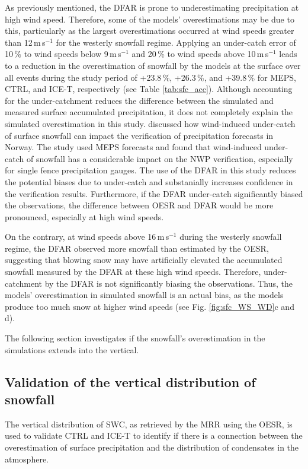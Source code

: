 \documentclass{ametsocV5}
\begin{document}
		As previously mentioned, the DFAR is prone to underestimating precipitation at high wind speed. Therefore, some of the models' overestimations may be due to this, particularly as the largest overestimations occurred at wind speeds greater than 12\,m\,s$^{-1}$ for the westerly snowfall regime. Applying an under-catch error of 10\,\% to wind speeds below 9\,m\,s$^{-1}$ and 20\,\% to wind speeds above 10\,m\,s$^{-1}$ leads to a reduction in the overestimation of snowfall by the models at the surface over all events during the study period of +23.8\,\%, +26.3\,\%, and +39.8\,\% for MEPS, CTRL, and ICE-T, respectively (see Table \ref{tab:sfc_acc}). Although accounting for the under-catchment reduces the difference between the simulated and measured surface accumulated precipitation, it does not completely explain the simulated overestimation in this study. \citet{koltzow_verification_2020} discussed how wind-induced under-catch of surface snowfall can impact the verification of precipitation forecasts in Norway. The study used MEPS forecasts and found that wind-induced under-catch of snowfall has a considerable impact on the NWP verification, especially for single fence precipitation gauges. The use of the DFAR in this study reduces the potential biases due to under-catch and substanially increases confidence in the verification results. Furthermore, if the DFAR under-catch significantly biased the observations, the difference between OESR and DFAR would be more pronounced, especially at high wind speeds. 
		
		On the contrary, at wind speeds above 16\,m\,s$^{-1}$ during the westerly snowfall regime, the DFAR observed more snowfall than estimated by the OESR, suggesting that blowing snow may have artificially elevated the accumulated snowfall measured by the DFAR at these high wind speeds. Therefore, under-catchment by the DFAR is not significantly biasing the observations. Thus, the models' overestimation in simulated snowfall is an actual bias, as the models produce too much snow at higher wind speeds (see Fig. \ref{fig:sfc_WS_WD}c and d).

		The following section investigates if the snowfall's overestimation in the simulations extends into the vertical.
				

	\subsection{Validation of the vertical distribution of snowfall}\label{sec:res:swc}
		The vertical distribution of SWC, as retrieved by the MRR using the OESR, is used to validate CTRL and ICE-T to identify if there is a connection between the overestimation of surface precipitation and the distribution of condensates in the atmosphere.
\end{document}
